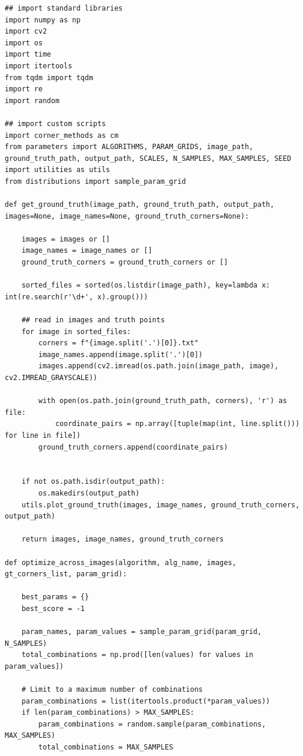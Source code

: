 \documentclass[journal]{IEEEtran}
\begin{document}
\begin{lstlisting}[style=python, caption={Driver Script for Project}, label={lst:driver}]
## import standard libraries
import numpy as np
import cv2
import os
import time
import itertools
from tqdm import tqdm
import re
import random

## import custom scripts
import corner_methods as cm
from parameters import ALGORITHMS, PARAM_GRIDS, image_path, ground_truth_path, output_path, SCALES, N_SAMPLES, MAX_SAMPLES, SEED
import utilities as utils
from distributions import sample_param_grid

def get_ground_truth(image_path, ground_truth_path, output_path, images=None, image_names=None, ground_truth_corners=None):
    
    images = images or []
    image_names = image_names or []
    ground_truth_corners = ground_truth_corners or []
    
    sorted_files = sorted(os.listdir(image_path), key=lambda x: int(re.search(r'\d+', x).group()))
    
    ## read in images and truth points
    for image in sorted_files:
        corners = f"{image.split('.')[0]}.txt"
        image_names.append(image.split('.')[0])
        images.append(cv2.imread(os.path.join(image_path, image), cv2.IMREAD_GRAYSCALE))
        
        with open(os.path.join(ground_truth_path, corners), 'r') as file:
            coordinate_pairs = np.array([tuple(map(int, line.split())) for line in file])
        ground_truth_corners.append(coordinate_pairs)
        

    if not os.path.isdir(output_path):
        os.makedirs(output_path)
    utils.plot_ground_truth(images, image_names, ground_truth_corners, output_path)
    
    return images, image_names, ground_truth_corners

def optimize_across_images(algorithm, alg_name, images, gt_corners_list, param_grid):

    best_params = {}
    best_score = -1

    param_names, param_values = sample_param_grid(param_grid, N_SAMPLES)
    total_combinations = np.prod([len(values) for values in param_values])
    
    # Limit to a maximum number of combinations
    param_combinations = list(itertools.product(*param_values))
    if len(param_combinations) > MAX_SAMPLES:
        param_combinations = random.sample(param_combinations, MAX_SAMPLES)
        total_combinations = MAX_SAMPLES
    

\end{lstlisting}
\end{document}

